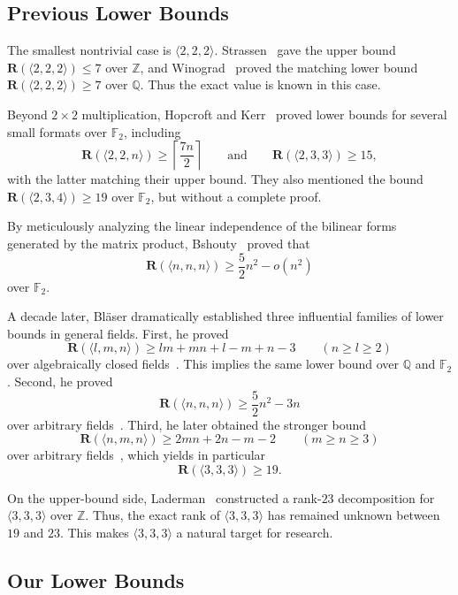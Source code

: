 \documentclass[11pt]{article}
\begin{document}
\subsection{Previous Lower Bounds}

The smallest nontrivial case is $\langle 2,2,2\rangle$.
Strassen~\cite{strassen1969gaussian} gave the upper bound $\mathbf{R}(\langle 2,2,2\rangle)\le 7$ over $\mathbb{Z}$,
and Winograd~\cite{winograd1971multiplication} proved the matching lower bound $\mathbf{R}(\langle 2,2,2\rangle)\ge 7$ over $\mathbb{Q}$.
Thus the exact value is known in this case.

Beyond $2\times 2$ multiplication, Hopcroft and Kerr~\cite{hopcroft1971minimizing} proved lower bounds for several small formats over $\mathbb{F}_2$, including
$$
  \mathbf{R}(\langle 2,2,n\rangle)\ge \left\lceil \frac{7n}{2}\right\rceil
  \qquad\text{and}\qquad
  \mathbf{R}(\langle 2,3,3\rangle)\ge 15,
$$
with the latter matching their upper bound.
They also mentioned the bound $\mathbf{R}(\langle 2,3,4\rangle)\ge 19$ over $\mathbb{F}_2$, but without a complete proof.

By meticulously analyzing the linear independence of the bilinear forms generated by the matrix product, Bshouty~\cite{bshouty1989lower} proved that
$$
  \mathbf{R}(\langle n,n,n\rangle)\ge \frac{5}{2}n^2 - o(n^2)
$$
over $\mathbb{F}_2$.

A decade later, Bl{\"a}ser dramatically established three influential families of lower bounds in general fields.
First, he proved
$$
  \mathbf{R}(\langle l,m,n\rangle)\ge lm+mn+l-m+n-3
  \qquad (n\ge l\ge 2)
$$
over algebraically closed fields~\cite{blaser1999lower}.
This implies the same lower bound over $\mathbb{Q}$ and $\mathbb{F}_2$.
Second, he proved
$$
  \mathbf{R}(\langle n,n,n\rangle)\ge \frac{5}{2}n^2-3n
$$
over arbitrary fields~\cite{blaser1999fivehalf}. Third, he later obtained the stronger bound
$$
  \mathbf{R}(\langle n,m,n\rangle)\ge 2mn+2n-m-2
  \qquad (m\ge n\ge 3)
$$
over arbitrary fields~\cite{blaser2003complexity}, which yields in particular
$$
  \mathbf{R}(\langle 3,3,3\rangle)\ge 19.
$$

On the upper-bound side, Laderman~\cite{laderman1976noncommutative} constructed a rank-$23$ decomposition for $\langle 3,3,3\rangle$ over $\mathbb{Z}$. Thus, the exact rank of $\langle 3,3,3\rangle$ has remained unknown between $19$ and $23$. This makes $\langle 3,3,3\rangle$ a natural target for research.

\subsection{Our Lower Bounds}
\end{document}

